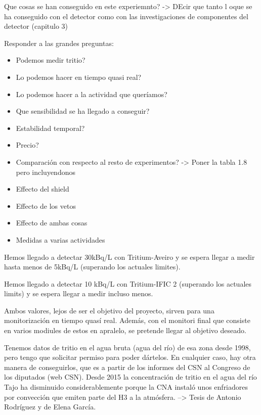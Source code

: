 Que cosas se han conseguido en este experiemnto? -> DEcir que tanto l oque se ha conseguido con el detector como con las investigaciones de componentes del detector (capitulo 3)

Responder a las grandes preguntas: 
\begin{itemize}
\item{} Podemos medir tritio? 
\item{} Lo podemos hacer en tiempo quasi real? 
\item{}Lo podemos hacer a la actividad que queríamos? 
\item{} Que sensibilidad se ha llegado a conseguir?
\item{} Estabilidad temporal?
\item{} Precio?
\item{} Comparación con respecto al resto de experimentos? -> Poner la tabla 1.8 pero incluyendonos
\item{} Effecto del shield
\item{} Effecto de los vetos
\item{} Effecto de ambas cosas
\item{} Medidas a varias actividades
\end{itemize}


Hemos llegado a detectar 30kBq/L con Tritium-Aveiro y se espera llegar a medir hasta menos de 5kBq/L (superando los actuales limites).

Hemos llegado a detectar 10 kBq/L con Tritium-IFIC 2 (superando los actuales limits) y se espera llegar a medir incluso menos.

Ambos valores, lejos de ser el objetivo del proyecto, sirven para una monitorización en tiempo quasí real. Además, con el monitori final que consiste en varios modiules de estos en apralelo, se pretende llegar al objetivo deseado.


Tenemos datos de tritio en el agua bruta (agua del río) de esa zona desde 1998, pero tengo que solicitar permiso para poder dártelos. En cualquier caso, hay otra manera de conseguirlos, que es a partir  de los informes del CSN al Congreso de los diputados (web CSN).
Desde 2015 la concentración de tritio en el agua del río Tajo ha disminuido considerablemente porque la CNA instaló unos enfriadores por convección que emiten parte del H3 a la atmósfera. --> Tesis de Antonio Rodríguez y de Elena García.




